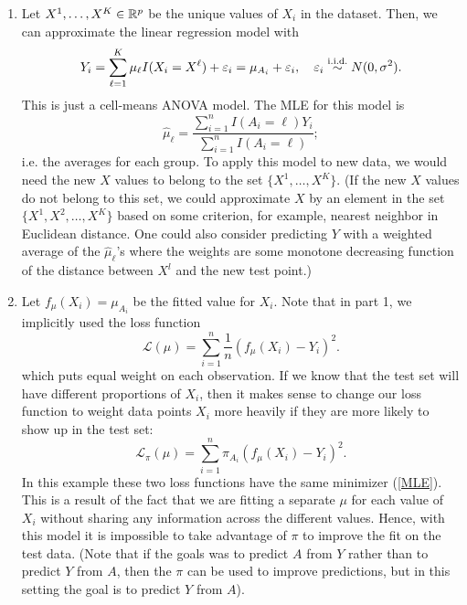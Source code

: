 \begin{enumerate}
\item Let $X^1, \dots, X^K \in \mathbb{R}^p$ be the unique values of $X_i$ in the dataset. Then, we can approximate the linear regression model with
	\begin{equation*}
	Y_i = \sum_{\ell = 1}^{K} \mu_\ell I(X_i = X^\ell) + {\varepsilon}_i = \mu_{A_i} + {\varepsilon}_i, \quad {\varepsilon}_i \overset{\text{i.i.d.}}{\sim} N(0, \sigma^2).
	\end{equation*}
	This is just a cell-means ANOVA model. The MLE for this model is
	\begin{equation}
	\hat \mu_\ell = \frac{\sum_{i = 1}^n I(A_i = \ell) Y_i}{\sum_{i = 1}^n I(A_i = \ell)};
	\label{MLE}
	\end{equation}
	i.e. the averages for each group. To apply this model to new data, we would need the new $X$ values to belong to the set $\{X^1, \dots, X^K\}$. (If the new $X$ values do not belong to this set, we could approximate $X$ by an element in the  set $\{X^1,X^2,\dots ,X^K \}$ based on some criterion, for example, nearest neighbor in Euclidean distance. One could also consider predicting $Y$ with a weighted average of the $\hat{\mu}_{\ell}$'s where the weights are some monotone decreasing function of the distance between $X^l$ and the new test point.)

\item Let $f_\mu(X_i) = \mu_{A_i}$ be the fitted value for $X_i$. Note that in part 1, we implicitly used the loss function
	\begin{equation*}
	\mathcal L(\mu) = \sum_{i = 1}^n \frac{1}{n}(f_\mu(X_i) - Y_i)^2.
	\end{equation*}
	which puts equal weight on each observation. If we know that the test set will have different proportions of $X_i$, then it makes sense to change our loss function to weight data points $X_i$ more heavily if they are more likely to show up in the test set:
	\begin{equation*}
	\mathcal L_\pi(\mu) = \sum_{i = 1}^n \pi_{A_i}(f_\mu(X_i) - Y_i)^2.
	\end{equation*}
	In this example these two loss functions have the same minimizer (\ref{MLE}). This is a result of the fact that we are fitting a separate $\mu$ for each value of $X_i$ without sharing any information across the different values. Hence, with this model it is impossible to take advantage of $\pi$ to improve the fit on the test data. (Note that if the goals was to predict $A$ from $Y$ rather than to predict $Y$ from $A$, then the $\pi$ can be used to improve predictions, but in this setting the goal is to predict $Y$ from $A$).


\end{enumerate}
